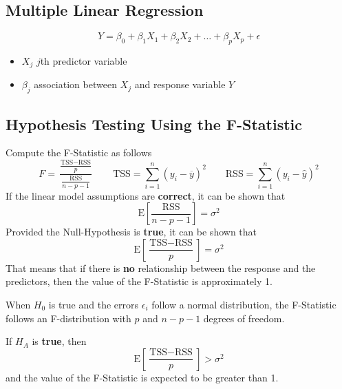 \documentclass[11pt]{article}
\theoremstyle{definition}
\newcommand*\samplemean[1]{\overline{#1}}
\newcommand*\ev[1]{\mathrel{\text{E}\left[#1\right]}}
\begin{document}
\subsection{Multiple Linear Regression}
\begin{definition}
	\begin{equation*}
		Y = \beta_0 + \beta_1 X_1 + \beta_2 X_2 + \dots + \beta_p X_p + \epsilon
	\end{equation*}
	\begin{itemize}[label=]
		\item $X_j$ \quad $j$th predictor variable
		\item $\beta_j$ \quad association between $X_j$ and response variable $Y$
	\end{itemize}
\end{definition}

\subsection{Hypothesis Testing Using the F-Statistic}
Compute the F-Statistic as follows
\begin{equation*}
	F = \frac{\frac{\text{TSS} - \text{RSS}}{p}}{\frac{\text{RSS}}{n-p-1}} \qquad \text{TSS} = \sum_{i=1}^{n} (y_i - \samplemean{y})^2 \qquad \text{RSS} = \sum_{i=1}^{n} (y_i - \hat{y})^2
\end{equation*}
If the linear model assumptions are \textbf{correct}, it can be shown that
\begin{equation*}
	\ev{\frac{\text{RSS}}{n-p-1}} = \sigma^2
\end{equation*}
Provided the Null-Hypothesis is \textbf{true}, it can be shown that
\begin{equation*}
	\ev{\frac{\text{TSS}-\text{RSS}}{p}} = \sigma^2
\end{equation*}
That means that if there is \textbf{no} relationship between the response and the predictors, then the value of the F-Statistic is approximately 1.

When $H_0$ is true and the errors $\epsilon_i$ follow a normal distribution, the F-Statistic follows an F-distribution with $p$ and $n-p-1$ degrees of freedom.

If $H_A$ is \textbf{true}, then 
\begin{equation*}
	\ev{\frac{\text{TSS}-\text{RSS}}{p}} > \sigma^2
\end{equation*}
and the value of the F-Statistic is expected to be greater than 1.
\end{document}
